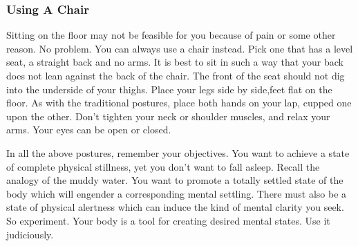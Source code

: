 \subsubsection*{Using A Chair} 
Sitting on the floor may not be feasible for you because of pain
or some other reason. No problem. You can always use a chair instead. Pick one
that has a level seat, a straight back and no arms. It is best to sit in such a
way that your back does not lean against the back of the chair. The front of the
seat should not dig into the underside of your thighs. Place your legs side by
side,feet flat on the floor. As with the traditional postures, place both hands
on your lap, cupped one upon the other. Don't tighten your neck or shoulder
muscles, and relax your arms. Your eyes can be open or closed.

In all the above postures, remember your objectives. You want to achieve a state
of complete physical stillness, yet you don't want to fall asleep. Recall the
analogy of the muddy water. You want to promote a totally settled state of the
body which will engender a corresponding mental settling. There must also be a
state of physical alertness which can induce the kind of mental clarity you
seek. So experiment. Your body is a tool for creating desired mental states. Use
it judiciously.
